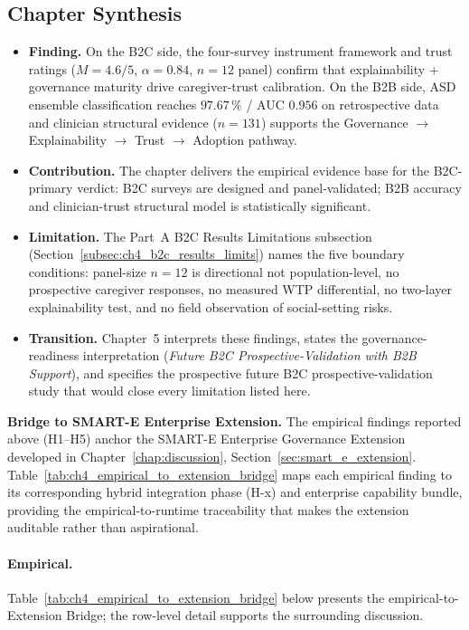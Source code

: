 \subsection{Chapter Synthesis}
\label{subsec:ch4_synthesis}

\begin{itemize}[leftmargin=*, itemsep=2pt]
    \item \textbf{Finding.} On the B2C side, the four-survey instrument framework and trust ratings ($M = 4.6/5$, $\alpha = 0.84$, $n = 12$ panel) confirm that explainability + governance maturity drive caregiver-trust calibration. On the B2B side, ASD ensemble classification reaches $97.67\,\%$ / AUC $0.956$ on retrospective data and clinician structural evidence ($n = 131$) supports the Governance $\to$ Explainability $\to$ Trust $\to$ Adoption pathway.
    \item \textbf{Contribution.} The chapter delivers the empirical evidence base for the B2C-primary verdict: B2C surveys are designed and panel-validated; B2B accuracy and clinician-trust structural model is statistically significant.
    \item \textbf{Limitation.} The Part~A B2C Results Limitations subsection (Section~\ref{subsec:ch4_b2c_results_limits}) names the five boundary conditions: panel-size $n = 12$ is directional not population-level, no prospective caregiver responses, no measured WTP differential, no two-layer explainability test, and no field observation of social-setting risks.
    \item \textbf{Transition.} Chapter~5 interprets these findings, states the governance-readiness interpretation (\emph{Future B2C Prospective-Validation with B2B Support}), and specifies the prospective future B2C prospective-validation study that would close every limitation listed here.
\end{itemize}

\noindent\textbf{Bridge to SMART-E Enterprise Extension.} The empirical findings reported above (H1--H5) anchor the SMART-E Enterprise Governance Extension developed in Chapter~\ref{chap:discussion}, Section~\ref{sec:smart_e_extension}. Table~\ref{tab:ch4_empirical_to_extension_bridge} maps each empirical finding to its corresponding hybrid integration phase (H-x) and enterprise capability bundle, providing the empirical-to-runtime traceability that makes the extension auditable rather than aspirational.

\paragraph{Empirical.}
\noindent Table~\ref{tab:ch4_empirical_to_extension_bridge} below presents the empirical-to-Extension Bridge; the row-level detail supports the surrounding discussion.

